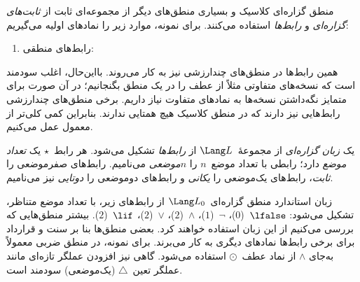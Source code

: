 \documentclass[../../../include/open-logic-section]{subfiles}
\begin{document}


منطق گزاره‌ای کلاسیک و بسیاری منطق‌های دیگر از مجموعه‌ای ثابت از
\emph{ثابت‌های گزاره‌ای} و \emph{رابط‌ها} استفاده می‌کنند. برای نمونه،
موارد زیر را نمادهای اولیه می‌گیریم:
\begin{enumerate}
\item رابط‌های منطقی:
  \startycommalist
\end{enumerate}

همین رابط‌ها در منطق‌های چندارزشی نیز به کار می‌روند. بااین‌حال، اغلب
سودمند است که نسخه‌های متفاوتی مثلاً از عطف را در یک منطق بگنجانیم؛
در آن صورت برای متمایز نگه‌داشتن نسخه‌ها به نمادهای متفاوت نیاز داریم.
برخی منطق‌های چندارزشی رابط‌هایی نیز دارند که در منطق کلاسیک هیچ همتایی
ندارند. بنابراین کمی کلی‌تر از معمول عمل می‌کنیم.

\begin{defn}
  یک \emph{زبان گزاره‌ای} از مجموعهٔ~$\Lang L$ از \emph{رابط‌ها} تشکیل
  می‌شود. هر رابط~$\star$ یک \emph{تعداد موضع} دارد؛ رابطی با تعداد
  موضع~$n$ را \emph{$n$موضعی} می‌نامیم. رابط‌های صفرموضعی را
  \emph{ثابت}، رابط‌های یک‌موضعی را \emph{یکانی} و رابط‌های دوموضعی را
  \emph{دوتایی} نیز می‌نامیم.
\end{defn}

\begin{ex}
  زبان استاندارد منطق گزاره‌ای~$\Lang L_0$ از رابط‌های زیر، با تعداد
  موضع متناظر، تشکیل می‌شود:
  $\lfalse$~($0$)،
  $\lnot$~($1$)،
  $\land$~($2$)،
  $\lor$~($2$)،
  $\lif$~($2$). بیشتر منطق‌هایی که بررسی می‌کنیم از این زبان استفاده
  خواهند کرد. بعضی منطق‌ها بنا بر سنت و قرارداد برای برخی رابط‌ها
  نمادهای دیگری به کار می‌برند. برای نمونه، در منطق ضربی معمولاً به‌جای
  $\land$ از نماد عطف~$\odot$ استفاده می‌شود. گاهی نیز افزودن عملگر
  تازه‌ای مانند عملگر تعین~$\triangle$ (یک‌موضعی) سودمند است.
\end{ex}
\end{document}
